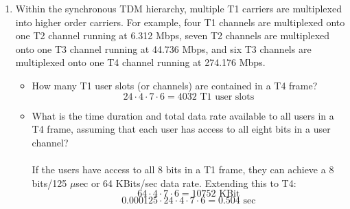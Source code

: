 \documentclass[12pt]{article}
\begin{document}
\begin{enumerate}
\newpage

\item Within the synchronous TDM hierarchy, multiple T1 carriers are multiplexed into higher order carriers. For example, four T1 channels are multiplexed onto one T2 channel running at 6.312 Mbps, seven T2 channels are multiplexed onto one T3 channel running at 44.736 Mbps, and six T3 channels are multiplexed onto one T4 channel running at 274.176 Mbps.  
  \begin{itemize}
  \item How many T1 user slots (or channels) are contained in a T4 frame?
    \[ 24 \cdot 4 \cdot 7 \cdot 6 = 4032 \textrm{ T1 user slots} \]
  \item What is the time duration and total data rate available to all users in a T4 frame, assuming that each user has access to all eight bits in a user channel? \\ \\
    If the users have access to all 8 bits in a T1 frame, they can achieve a 8 bits/125 $\mu$sec or 64 KBits/sec data rate. Extending this to T4:
    \[ 64 \cdot 4 \cdot 7 \cdot 6 = 10752 \textrm{ KBit} \]
    \[ 0.000125 \cdot 24 \cdot 4 \cdot 7 \cdot 6 = 0.504 \textrm{ sec}\] 
  \end{itemize}

\end{enumerate}
\end{document}
